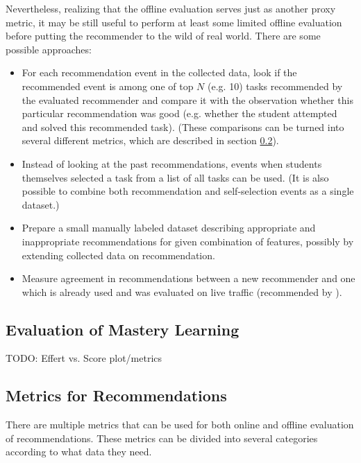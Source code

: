 Nevertheless, realizing that the offline evaluation serves just as another proxy metric,
  it may be still useful to perform at least some limited offline evaluation
  before putting the recommender to the wild of real world.
There are some possible approaches:
\begin{itemize}
  \item For each recommendation event in the collected data,
      look if the recommended event is among one of top $N$ (e.g. 10) tasks
      recommended by the evaluated recommender
      and compare it with the observation whether this particular recommendation
      was good (e.g. whether the student attempted and solved this recommended task).
      (These comparisons can be turned into several different metrics,
       which are described in section \ref{sec:metrics-for-recommendation}).
  \item Instead of looking at the past recommendations,
      events when students themselves selected a task from a list of all tasks can be used.
      (It is also possible to combine both recommendation and self-selection events
       as a single dataset.)
  \item Prepare a small manually labeled dataset describing appropriate and
    inappropriate recommendations for given combination of features, possibly
    by extending collected data on recommendation.
  \item Measure agreement in recommendations between a new recommender and one which is already used and was evaluated on live traffic (recommended by \cite[][Rule \#24]{google-ml-rules}).
\end{itemize}


\subsection{Evaluation of Mastery Learning}

TODO: Effert vs. Score plot/metrics \cite{learner-models-integration-skills}

\subsection{Metrics for Recommendations}
\label{sec:metrics-for-recommendation}

There are multiple metrics that can be used for both online and offline
evaluation of recommendations.
These metrics can be divided into several categories
according to what data they need.

